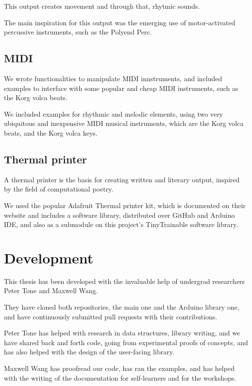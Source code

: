 This output creates movement and through that, rhytmic sounds.

The main inspiration for this output was the emerging use of motor-activated percussive instruments, such as the Polyend Perc.

\subsection{MIDI}

We wrote functionalities to manipulate MIDI innstruments, and included examples to interface with some popular and cheap MIDI instruments, such as the Korg volca beats.

We included examples for rhythmic and melodic elements, using two very ubiquitous and inexpensive MIDI musical instruments, which are the Korg volca beats, and the Korg volca keys.

\subsection{Thermal printer}

A thermal printer is the basis for creating written and literary output, inspired by the field of computational poetry.

We used the popular Adafruit Thermal printer kit, which is documented on their website and includes a software library, distributed over GitHub and Arduino IDE, and also as a submodule on this project's TinyTrainable software library.

\section{Development}

This thesis has been developed with the invaluable help of undergrad researchers Peter Tone and Maxwell Wang.

They have cloned both repositories, the main one and the Arduino library one, and have continuously submitted pull requests with their contributions.

Peter Tone has helped with research in data structures, library writing, and we have shared back and forth code, going from experimental proofs of concepts, and has also helped with the design of the user-facing library.

Maxwell Wang has proofread our code, has ran the examples, and has helped with the writing of the documentation for self-learners and for the workshops.

